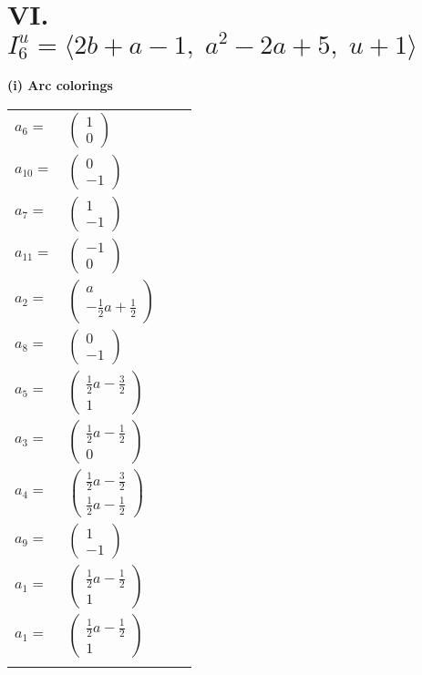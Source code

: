 \documentclass[1p]{elsarticle_modified}
\theoremstyle{definition}
\begin{document}
\centering \section*{VI. $I^u_{6}= \langle 2 b+a-1,\;a^2-2 a+5,\;u+1 \rangle$}
\flushleft \textbf{(i) Arc colorings}\\
\begin{tabular}{m{7pt} m{180pt} m{7pt} m{180pt} }
\flushright $a_{6}=$&$\begin{pmatrix}1\\0\end{pmatrix}$ \\
\flushright $a_{10}=$&$\begin{pmatrix}0\\-1\end{pmatrix}$ \\
\flushright $a_{7}=$&$\begin{pmatrix}1\\-1\end{pmatrix}$ \\
\flushright $a_{11}=$&$\begin{pmatrix}-1\\0\end{pmatrix}$ \\
\flushright $a_{2}=$&$\begin{pmatrix}a\\-\frac{1}{2} a+\frac{1}{2}\end{pmatrix}$ \\
\flushright $a_{8}=$&$\begin{pmatrix}0\\-1\end{pmatrix}$ \\
\flushright $a_{5}=$&$\begin{pmatrix}\frac{1}{2} a-\frac{3}{2}\\1\end{pmatrix}$ \\
\flushright $a_{3}=$&$\begin{pmatrix}\frac{1}{2} a-\frac{1}{2}\\0\end{pmatrix}$ \\
\flushright $a_{4}=$&$\begin{pmatrix}\frac{1}{2} a-\frac{3}{2}\\\frac{1}{2} a-\frac{1}{2}\end{pmatrix}$ \\
\flushright $a_{9}=$&$\begin{pmatrix}1\\-1\end{pmatrix}$ \\
\flushright $a_{1}=$&$\begin{pmatrix}\frac{1}{2} a-\frac{1}{2}\\1\end{pmatrix}$\\ \flushright $a_{1}=$&$\begin{pmatrix}\frac{1}{2} a-\frac{1}{2}\\1\end{pmatrix}$\\&\end{tabular}
\end{document}
